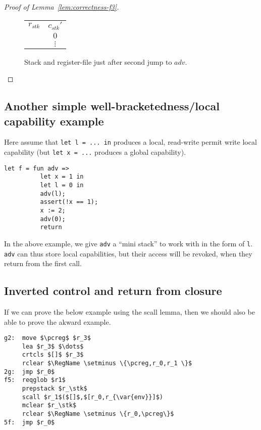 \documentclass[a4paper]{article}
\newcommand{\var}[1]{\mathit{#1}}
\newcommand{\pcreg}{\mathrm{pc}}
\newcommand{\adv}{\var{adv}}
\newcommand{\stk}{\var{stk}}
\newcommand{\plaindom}[1]{\mathrm{#1}}
\newcommand{\RegName}{\plaindom{RegisterName}}
\begin{document}
\begin{proof}[Proof of Lemma~\ref{lem:correctness-f3}]
\begin{enumproof}[start=3]
\begin{enumproof}[start=3]
\begin{figure}
\begin{tabular}{r |c |}
          \cline{2-2}
          $r_{\var{stk}}$  & $c_{\var{stk}}'$ \\
          \cline{2-2}
                   & $0$ \\
          \cline{2-2}
                   & $\vdots$ \\
          \cline{2-2}
        \end{tabular}
        \caption{Stack and register-file just after second jump to $\adv$.}
        \label{fig:f3-stack-before-snd-adv}
      \end{figure}
    \end{enumproof}
  \end{enumproof}
\end{proof}

\subsection{Another simple well-bracketedness/local capability example}
Here assume that \texttt{let l = ... in} produces a local, read-write permit write local capability (but \texttt{let x = ...} produces a global capability). 
\begin{verbatim}
let f = fun adv =>
          let x = 1 in
          let l = 0 in
          adv(l);
          assert(!x == 1);
          x := 2;
          adv(0);
          return
\end{verbatim}
In the above example, we give \texttt{adv} a ``mini stack'' to work with in the form of \texttt{l}. \texttt{adv} can thus store local capabilities, but their access will be revoked, when they return from the first call.

\subsection{Inverted control and return from closure}
If we can prove the below example using the scall lemma, then we should also be able to prove the akward example.
\begin{lstlisting}
g2:  move $\pcreg$ $r_3$
     lea $r_3$ $\dots$
     crtcls $[]$ $r_3$
     rclear $\RegName \setminus \{\pcreg,r_0,r_1 \}$
2g:  jmp $r_0$
f5:  reqglob $r1$
     prepstack $r_\stk$
     scall $r_1$($[]$,$[r_0,r_{\var{env}}]$)
     mclear $r_\stk$
     rclear $\RegName \setminus \{r_0,\pcreg\}$
5f:  jmp $r_0$
\end{lstlisting}
\end{document}

